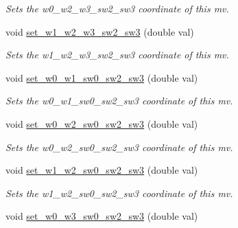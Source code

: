\begin{DoxyCompactItemize}
\begin{DoxyCompactList}\small\item\em Sets the w0\-\_\-w2\-\_\-w3\-\_\-sw2\-\_\-sw3 coordinate of this mv. \end{DoxyCompactList}\item 
\hypertarget{classe3ga_1_1mv_a3e13ff1a36211546d2adb89e2fe9c9f1}{void \hyperlink{classe3ga_1_1mv_a3e13ff1a36211546d2adb89e2fe9c9f1}{set\-\_\-w1\-\_\-w2\-\_\-w3\-\_\-sw2\-\_\-sw3} (double val)}\label{classe3ga_1_1mv_a3e13ff1a36211546d2adb89e2fe9c9f1}

\begin{DoxyCompactList}\small\item\em Sets the w1\-\_\-w2\-\_\-w3\-\_\-sw2\-\_\-sw3 coordinate of this mv. \end{DoxyCompactList}\item 
\hypertarget{classe3ga_1_1mv_a93ea1fc107ef3635e67d63d1fdc42dc8}{void \hyperlink{classe3ga_1_1mv_a93ea1fc107ef3635e67d63d1fdc42dc8}{set\-\_\-w0\-\_\-w1\-\_\-sw0\-\_\-sw2\-\_\-sw3} (double val)}\label{classe3ga_1_1mv_a93ea1fc107ef3635e67d63d1fdc42dc8}

\begin{DoxyCompactList}\small\item\em Sets the w0\-\_\-w1\-\_\-sw0\-\_\-sw2\-\_\-sw3 coordinate of this mv. \end{DoxyCompactList}\item 
\hypertarget{classe3ga_1_1mv_a21b93de4a1cb497e79a460cc4fce1027}{void \hyperlink{classe3ga_1_1mv_a21b93de4a1cb497e79a460cc4fce1027}{set\-\_\-w0\-\_\-w2\-\_\-sw0\-\_\-sw2\-\_\-sw3} (double val)}\label{classe3ga_1_1mv_a21b93de4a1cb497e79a460cc4fce1027}

\begin{DoxyCompactList}\small\item\em Sets the w0\-\_\-w2\-\_\-sw0\-\_\-sw2\-\_\-sw3 coordinate of this mv. \end{DoxyCompactList}\item 
\hypertarget{classe3ga_1_1mv_a9c7f74493de98f36bcc2ec1102daae90}{void \hyperlink{classe3ga_1_1mv_a9c7f74493de98f36bcc2ec1102daae90}{set\-\_\-w1\-\_\-w2\-\_\-sw0\-\_\-sw2\-\_\-sw3} (double val)}\label{classe3ga_1_1mv_a9c7f74493de98f36bcc2ec1102daae90}

\begin{DoxyCompactList}\small\item\em Sets the w1\-\_\-w2\-\_\-sw0\-\_\-sw2\-\_\-sw3 coordinate of this mv. \end{DoxyCompactList}\item 
\hypertarget{classe3ga_1_1mv_ae9172a66b57762b694a9a4510b78cad1}{void \hyperlink{classe3ga_1_1mv_ae9172a66b57762b694a9a4510b78cad1}{set\-\_\-w0\-\_\-w3\-\_\-sw0\-\_\-sw2\-\_\-sw3} (double val)}\label{classe3ga_1_1mv_ae9172a66b57762b694a9a4510b78cad1}


\end{DoxyCompactItemize}
